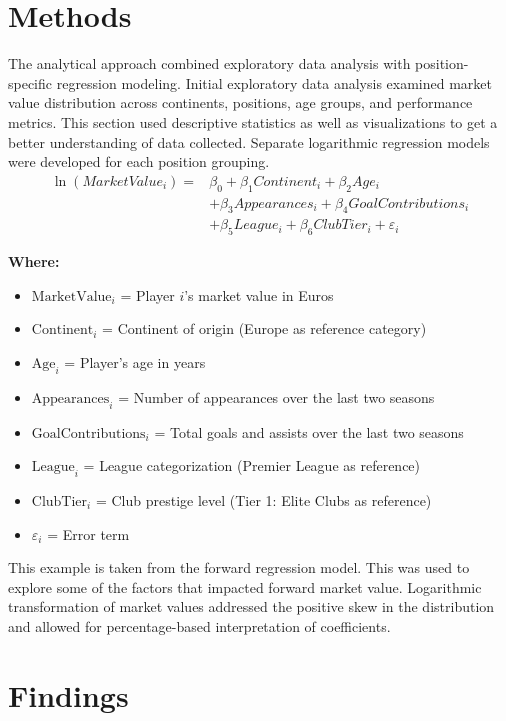 \documentclass[12pt,a4paper]{article}
\begin{document}
\section{Methods}
\label{sec:Methods}

The analytical approach combined exploratory data analysis with position-specific regression modeling. Initial exploratory data analysis examined market value distribution across continents, positions, age groups, and performance metrics. This section used descriptive statistics as well as visualizations to get a better understanding of data collected. Separate logarithmic regression models were developed for each position grouping. 
\begin{equation} 
\begin{split} 
\ln(MarketValue_i) = & \beta_0 + \beta_1 Continent_i + \beta_2 Age_i \\ 
& + \beta_3 Appearances_i + \beta_4 GoalContributions_i \\ 
& + \beta_5 League_i + \beta_6 ClubTier_i + \varepsilon_i 
\end{split} 
\end{equation}

\noindent \textbf{Where:} 
\begin{itemize}
    \item $\text{MarketValue}_i$ = Player $i$'s market value in Euros 
    \item $\text{Continent}_i$ = Continent of origin (Europe as reference category) 
    \item $\text{Age}_i$ = Player's age in years 
    \item $\text{Appearances}_i$ = Number of appearances over the last two seasons 
    \item $\text{GoalContributions}_i$ = Total goals and assists over the last two seasons 
    \item $\text{League}_i$ = League categorization (Premier League as reference) 
    \item $\text{ClubTier}_i$ = Club prestige level (Tier 1: Elite Clubs as reference)
    \item $\varepsilon_i$ = Error term 
\end{itemize}
This example is taken from the forward regression model. This was used to explore some of the factors that impacted forward market value. Logarithmic transformation of market values addressed the positive skew in the distribution and allowed for percentage-based interpretation of coefficients.


\section{Findings}
\label{sec:Findings}
\end{document}
